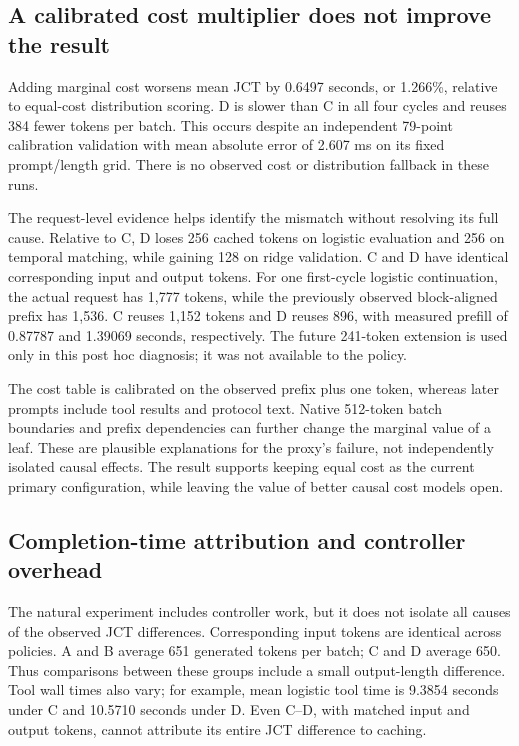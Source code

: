 \documentclass[sigconf, screen, review]{acmart}
\begin{document}
\subsection{A calibrated cost multiplier does not improve the
result}\label{a-calibrated-cost-multiplier-does-not-improve-the-result}

Adding marginal cost worsens mean JCT by 0.6497 seconds, or 1.266\%,
relative to equal-cost distribution scoring. D is slower than C in all
four cycles and reuses 384 fewer tokens per batch. This occurs despite
an independent 79-point calibration validation with mean absolute error
of 2.607 ms on its fixed prompt/length grid. There is no observed cost
or distribution fallback in these runs.

The request-level evidence helps identify the mismatch without resolving
its full cause. Relative to C, D loses 256 cached tokens on logistic
evaluation and 256 on temporal matching, while gaining 128 on ridge
validation. C and D have identical corresponding input and output
tokens. For one first-cycle logistic continuation, the actual request
has 1,777 tokens, while the previously observed block-aligned prefix has
1,536. C reuses 1,152 tokens and D reuses 896, with measured prefill of
0.87787 and 1.39069 seconds, respectively. The future 241-token
extension is used only in this post hoc diagnosis; it was not available
to the policy.

The cost table is calibrated on the observed prefix plus one token,
whereas later prompts include tool results and protocol text. Native
512-token batch boundaries and prefix dependencies can further change
the marginal value of a leaf. These are plausible explanations for the
proxy's failure, not independently isolated causal effects. The result
supports keeping equal cost as the current primary configuration, while
leaving the value of better causal cost models open.

\subsection{Completion-time attribution and controller
overhead}\label{completion-time-attribution-and-controller-overhead}

The natural experiment includes controller work, but it does not isolate
all causes of the observed JCT differences. Corresponding input tokens
are identical across policies. A and B average 651 generated tokens per
batch; C and D average 650. Thus comparisons between these groups
include a small output-length difference. Tool wall times also vary; for
example, mean logistic tool time is 9.3854 seconds under C and 10.5710
seconds under D. Even C--D, with matched input and output tokens, cannot
attribute its entire JCT difference to caching.
\end{document}
